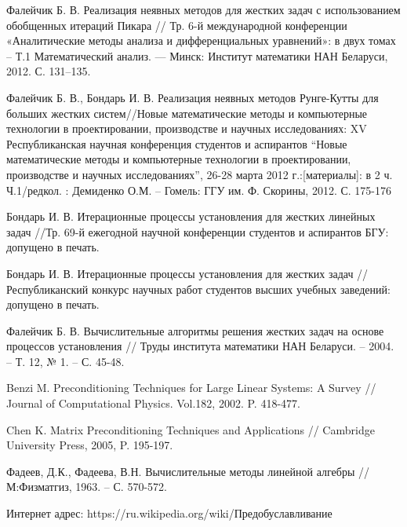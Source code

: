 \documentclass[a4paper,14pt]{extreport}
\begin{document}
\begin{thebibliography}{99}
Фалейчик Б. В. Реализация неявных методов для жестких задач с использованием обобщенных итераций Пикара // Тр. 6-й международной конференции «Аналитические методы анализа и дифференциальных уравнений»: в двух томах – Т.1 Математический анализ. — Минск: Институт математики НАН Беларуси, 2012. С. 131–135.

Фалейчик Б. В., Бондарь И. В. Реализация неявных методов Рунге-Кутты для больших жестких систем//Новые математические методы и компьютерные технологии в проектировании, производстве и научных исследованиях: XV Республиканская научная конференция студентов и аспирантов ``Новые математические методы и компьютерные технологии в проектировании, производстве и научных исследованиях'', 26-28 марта 2012 г.:[материалы]: в 2 ч. Ч.1/редкол. : Демиденко О.М. -- Гомель: ГГУ им. Ф. Скорины, 2012. С. 175-176

Бондарь И. В. Итерационные процессы установления для жестких линейных задач //Тр. 69-й ежегодной научной конференции студентов и аспирантов БГУ: допущено в печать.

Бондарь И. В. Итерационные процессы установления для жестких задач //Республиканский конкурс научных работ студентов высших учебных заведений: допущено в печать.

Фалейчик Б. В. Вычислительные алгоритмы решения жестких задач на основе процессов установления // Труды института математики НАН Беларуси. -- 2004. -- Т. 12, № 1. -- С. 45-48.

Benzi M. Preconditioning Techniques for Large Linear Systems: A Survey // Journal of Computational Physics. Vol.182, 2002. P. 418-477.

Chen K. Matrix Preconditioning Techniques and Applications // Cambridge University Press, 2005, P. 195-197.

Фадеев, Д.К., Фадеева, В.Н. Вычислительные методы линейной алгебры // М:Физматгиз, 1963. -- С. 570-572.

 Интернет адрес: https://ru.wikipedia.org/wiki/Предобуславливание
\end{thebibliography}


  \appendix
\end{document}

